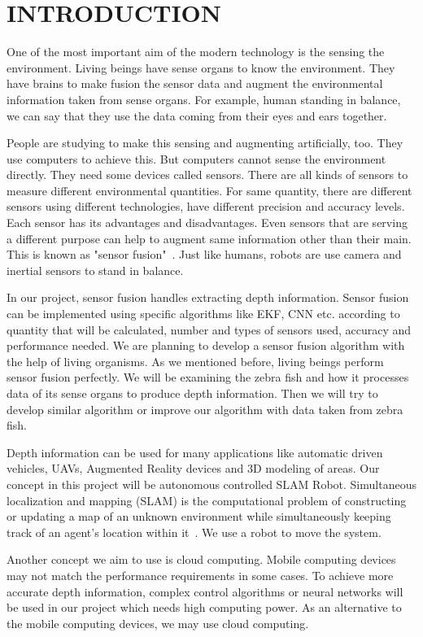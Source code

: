 \documentclass[12pt]{article}
\begin{document}
\section{INTRODUCTION}

One of the most important aim of the modern technology is the sensing the environment. Living beings have sense organs to know the environment. They have brains to make fusion the sensor data and augment the environmental information taken from sense organs. For example, human standing in balance, we can say that they use the data coming from their eyes and ears together.

People are studying to make this sensing and augmenting artificially, too. They use computers to achieve this. But computers cannot sense the environment directly. They need some devices called sensors. There are all kinds of sensors to measure different environmental quantities. For same quantity, there are different sensors using different technologies, have different precision and accuracy levels. Each sensor has its advantages and disadvantages. Even sensors that are serving a different purpose can help to augment same information other than their main. This is known as "sensor fusion"~\cite{enwiki:1115352853}. Just like humans, robots are use camera and inertial sensors to stand in balance.

In our project, sensor fusion handles extracting depth information. Sensor fusion can be implemented using specific algorithms like EKF, CNN etc. according to quantity that will be calculated, number and types of sensors used, accuracy and performance needed. We are planning to develop a sensor fusion algorithm with the help of living organisms. As we mentioned before, living beings perform sensor fusion perfectly. We will be examining the zebra fish and how it processes data of its sense organs to produce depth information. Then we will try to develop similar algorithm or improve our algorithm with data taken from zebra fish.

Depth information can be used for many applications like automatic driven vehicles, UAVs, Augmented Reality devices and 3D modeling of areas. Our concept in this project will be autonomous controlled SLAM Robot. Simultaneous localization and mapping (SLAM) is the computational problem of constructing or updating a map of an unknown environment while simultaneously keeping track of an agent's location within it~\cite{enwiki:1120084976}. We use a robot to move the system.

Another concept we aim to use is cloud computing. Mobile computing devices may not match the performance requirements in some cases. To achieve more accurate depth information, complex control algorithms or neural networks will be used in our project which needs high computing power. As an alternative to the mobile computing devices, we may use cloud computing.
\end{document}
